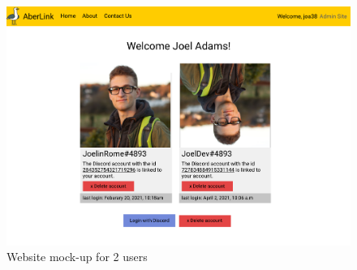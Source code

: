 \begin{figure}[H]
	\centering
	\includegraphics[width=0.9\linewidth]{Figures/AberLink-web-2}
	\caption{Website mock-up for 2 users}
	\label{fig:web-mock-2}
\end{figure}


